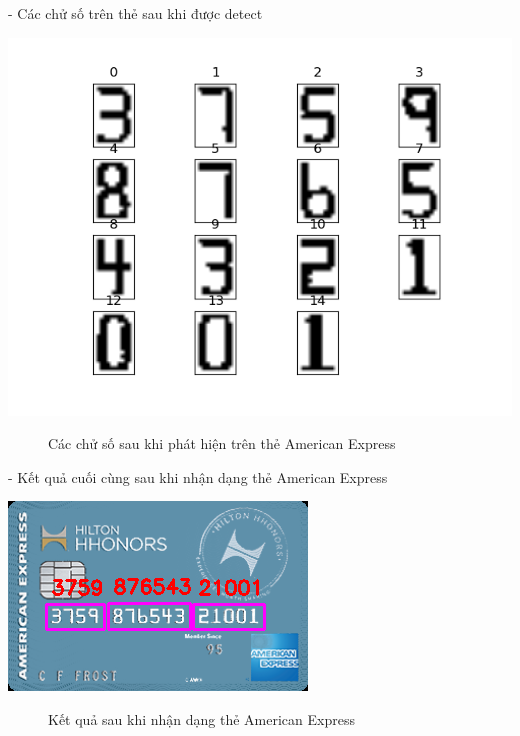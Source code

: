 - Các chử số trên thẻ sau khi được detect 
\begin{center}
    \includegraphics[scale = 0.8]{images/americanexpress/digits.png}
\end{center}

\begin{figure}[htp!]
    \caption{Các chử số sau khi phát hiện trên thẻ American Express}
\end{figure}

- Kết quả cuối cùng sau khi nhận dạng thẻ American Express
\begin{center}
    \includegraphics[scale = 1]{images/americanexpress/result.png}
\end{center}
\begin{figure}[htp!]
    \caption{Kết quả sau khi nhận dạng thẻ American Express}
\end{figure}